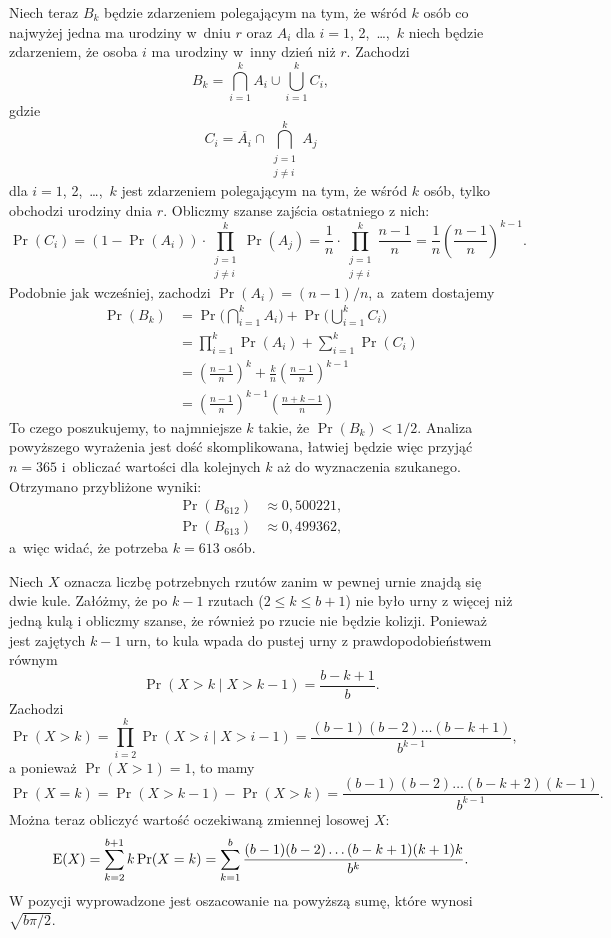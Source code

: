 Niech teraz $B_k$ będzie zdarzeniem polegającym na tym, że wśród $k$ osób co najwyżej jedna ma urodziny w~dniu $r$ oraz $A_i$ dla $i=1$, 2,~\dots,~$k$ niech będzie zdarzeniem, że osoba $i$ ma urodziny w~inny dzień niż $r$. Zachodzi
\[
	B_k = \bigcap_{i=1}^kA_i\cup\bigcup_{i=1}^kC_i,
\]
gdzie
\[
	C_i = \overline{A_i}\cap\bigcap_{\substack{j=1\\j\ne i}}^kA_j
\]
dla $i=1$, 2,~\dots,~$k$ jest zdarzeniem polegającym na tym, że wśród $k$ osób, tylko  obchodzi urodziny dnia $r$. Obliczmy szanse zajścia ostatniego z nich:
\[
	\Pr(C_i) = (1-\Pr(A_i))\cdot\prod_{\substack{j=1\\j\ne i}}^k\Pr(A_j) = \frac{1}{n}\cdot\prod_{\substack{j=1\\j\ne i}}^k\frac{n-1}{n} = \frac{1}{n}\left(\frac{n-1}{n}\right)^{k-1}.
\]
Podobnie jak wcześniej, zachodzi $\Pr(A_i)=(n-1)/n$, a~zatem dostajemy
\begin{align*}
	\Pr(B_k) &= \Pr\biggl(\bigcap_{i=1}^kA_i\biggr)+\Pr\biggl(\bigcup_{i=1}^kC_i\biggr) \\
	&= \prod_{i=1}^k\Pr(A_i)+\sum_{i=1}^k\Pr(C_i) \\
	&= \left(\frac{n-1}{n}\right)^k+\frac{k}{n}\left(\frac{n-1}{n}\right)^{k-1} \\
	&= \left(\frac{n-1}{n}\right)^{k-1}\left(\frac{n+k-1}{n}\right)
\end{align*}
To czego poszukujemy, to najmniejsze $k$ takie, że $\Pr(B_k)<1/2$. Analiza powyższego wyrażenia jest dość skomplikowana, łatwiej będzie więc przyjąć $n=365$ i~obliczać wartości dla kolejnych $k$ aż do wyznaczenia szukanego. Otrzymano przybliżone wyniki:
\begin{align*}
    \Pr(B_{612}) &\approx 0{,}500221,\\
	\Pr(B_{613}) &\approx 0{,}499362,
\end{align*}
a~więc widać, że potrzeba $k=613$ osób.

\exercise %
Niech $X$ oznacza liczbę potrzebnych rzutów zanim w pewnej urnie znajdą się dwie kule. Załóżmy, że po $k-1$ rzutach ($2\le k\le b+1$) nie było urny z więcej niż jedną kulą i obliczmy szanse, że również po  rzucie nie będzie kolizji. Ponieważ jest zajętych $k-1$ urn, to  kula wpada do pustej urny z prawdopodobieństwem równym
\[
    \Pr(X>k\mid X>k-1) = \frac{b-k+1}{b}.
\]
Zachodzi
\[
    \Pr(X>k) = \prod_{i=2}^k\Pr(X>i\mid X>i-1) = \frac{(b-1)(b-2)\dots(b-k+1)}{b^{k-1}},
\]
a ponieważ $\Pr(X>1)=1$, to mamy
\[
    \Pr(X=k) = \Pr(X>k-1)-\Pr(X>k) = \frac{(b-1)(b-2)\dots(b-k+2)(k-1)}{b^{k-1}}.
\]
Można teraz obliczyć wartość oczekiwaną zmiennej losowej $X$:
\[
    \operatorname{E}(X) = \sum_{k=2}^{b+1}k\Pr(X=k) = \sum_{k=1}^b\frac{(b-1)(b-2)\dots(b-k+1)(k+1)k}{b^k}.
\]
W pozycji \cite{taocp1} wyprowadzone jest oszacowanie na powyższą sumę, które wynosi $\sqrt{b\pi/2}$.

